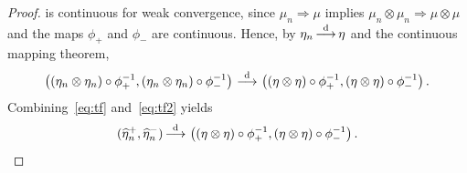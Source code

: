 \documentclass[10pt,a4paper]{amsart}
\newcommand{\convdis}{\,{\buildrel \mathrm{d} \over \longrightarrow}\,}
\begin{document}
\begin{proof}
		is continuous for weak convergence, since $\mu_n \Rightarrow \mu$ implies $\mu_n\otimes\mu_n\Rightarrow\mu\otimes\mu$ and the maps $\phi_+$ and $\phi_-$ are continuous. Hence, by $\eta_n \convdis \eta$ and the continuous mapping theorem,
		\begin{align}
			\label{eq:tf2}
			\left( (\eta_n\otimes\eta_n)\circ\phi_+^{-1}, (\eta_n\otimes\eta_n)\circ\phi_-^{-1}\right) \convdis \left( (\eta\otimes\eta)\circ\phi_+^{-1}, (\eta\otimes\eta)\circ\phi_-^{-1}\right).
		\end{align}
		Combining~\eqref{eq:tf} and~\eqref{eq:tf2} yields
		\[
			(\widehat{\eta}_n^+, \widehat{\eta}_n^-) \convdis \left( (\eta\otimes\eta)\circ\phi_+^{-1}, (\eta\otimes\eta)\circ\phi_-^{-1}\right).
		\]
\end{proof}
\end{document}
